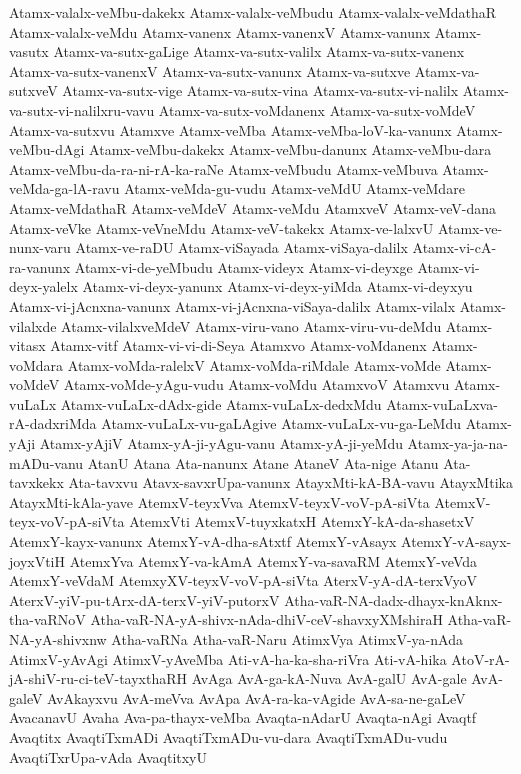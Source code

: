 {Atamx-valalx-veMbu-dakekx
Atamx-valalx-veMbudu
Atamx-valalx-veMdathaR
Atamx-valalx-veMdu
Atamx-vanenx
Atamx-vanenxV
Atamx-vanunx
Atamx-vasutx
Atamx-va-sutx-gaLige
Atamx-va-sutx-valilx
Atamx-va-sutx-vanenx
Atamx-va-sutx-vanenxV
Atamx-va-sutx-vanunx
Atamx-va-sutxve
Atamx-va-sutxveV
Atamx-va-sutx-vige
Atamx-va-sutx-vina
Atamx-va-sutx-vi-nalilx
Atamx-va-sutx-vi-nalilxru-vavu
Atamx-va-sutx-voMdanenx
Atamx-va-sutx-voMdeV
Atamx-va-sutxvu
Atamxve
Atamx-veMba
Atamx-veMba-loV-ka-vanunx
Atamx-veMbu-dAgi
Atamx-veMbu-dakekx
Atamx-veMbu-danunx
Atamx-veMbu-dara
Atamx-veMbu-da-ra-ni-rA-ka-raNe
Atamx-veMbudu
Atamx-veMbuva
Atamx-veMda-ga-lA-ravu
Atamx-veMda-gu-vudu
Atamx-veMdU
Atamx-veMdare
Atamx-veMdathaR
Atamx-veMdeV
Atamx-veMdu
AtamxveV
Atamx-veV-dana
Atamx-veVke
Atamx-veVneMdu
Atamx-veV-takekx
Atamx-ve-lalxvU
Atamx-ve-nunx-varu
Atamx-ve-raDU
Atamx-viSayada
Atamx-viSaya-dalilx
Atamx-vi-cA-ra-vanunx
Atamx-vi-de-yeMbudu
Atamx-videyx
Atamx-vi-deyxge
Atamx-vi-deyx-yalelx
Atamx-vi-deyx-yanunx
Atamx-vi-deyx-yiMda
Atamx-vi-deyxyu
Atamx-vi-jAcnxna-vanunx
Atamx-vi-jAcnxna-viSaya-dalilx
Atamx-vilalx
Atamx-vilalxde
Atamx-vilalxveMdeV
Atamx-viru-vano
Atamx-viru-vu-deMdu
Atamx-vitasx
Atamx-vitf
Atamx-vi-vi-di-Seya
Atamxvo
Atamx-voMdanenx
Atamx-voMdara
Atamx-voMda-ralelxV
Atamx-voMda-riMdale
Atamx-voMde
Atamx-voMdeV
Atamx-voMde-yAgu-vudu
Atamx-voMdu
AtamxvoV
Atamxvu
Atamx-vuLaLx
Atamx-vuLaLx-dAdx-gide
Atamx-vuLaLx-dedxMdu
Atamx-vuLaLxva-rA-dadxriMda
Atamx-vuLaLx-vu-gaLAgive
Atamx-vuLaLx-vu-ga-LeMdu
Atamx-yAji
Atamx-yAjiV
Atamx-yA-ji-yAgu-vanu
Atamx-yA-ji-yeMdu
Atamx-ya-ja-na-mADu-vanu
AtanU
Atana
Ata-nanunx
Atane
AtaneV
Ata-nige
Atanu
Ata-tavxkekx
Ata-tavxvu
Atavx-savxrUpa-vanunx
AtayxMti-kA-BA-vavu
AtayxMtika
AtayxMti-kAla-yave
AtemxV-teyxVva
AtemxV-teyxV-voV-pA-siVta
AtemxV-teyx-voV-pA-siVta
AtemxVti
AtemxV-tuyxkatxH
AtemxY-kA-da-shasetxV
AtemxY-kayx-vanunx
AtemxY-vA-dha-sAtxtf
AtemxY-vAsayx
AtemxY-vA-sayx-joyxVtiH
AtemxYva
AtemxY-va-kAmA
AtemxY-va-savaRM
AtemxY-veVda
AtemxY-veVdaM
AtemxyXV-teyxV-voV-pA-siVta
AterxV-yA-dA-terxVyoV
AterxV-yiV-pu-tArx-dA-terxV-yiV-putorxV
Atha-vaR-NA-dadx-dhayx-knAknx-tha-vaRNoV
Atha-vaR-NA-yA-shivx-nAda-dhiV-ceV-shavxyXMshiraH
Atha-vaR-NA-yA-shivxnw
Atha-vaRNa
Atha-vaR-Naru
AtimxVya
AtimxV-ya-nAda
AtimxV-yAvAgi
AtimxV-yAveMba
Ati-vA-ha-ka-sha-riVra
Ati-vA-hika
AtoV-rA-jA-shiV-ru-ci-teV-tayxthaRH
AvAga
AvA-ga-kA-Nuva
AvA-galU
AvA-gale
AvA-galeV
AvAkayxvu
AvA-meVva
AvApa
AvA-ra-ka-vAgide
AvA-sa-ne-gaLeV
AvacanavU
Avaha
Ava-pa-thayx-veMba
Avaqta-nAdarU
Avaqta-nAgi
Avaqtf
Avaqtitx
AvaqtiTxmADi
AvaqtiTxmADu-vu-dara
AvaqtiTxmADu-vudu
AvaqtiTxrUpa-vAda
AvaqtitxyU
}
